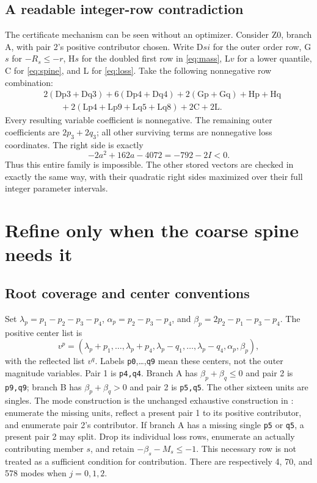 \documentclass[11pt,a4paper]{article}
\begin{document}
\subsection{A readable integer-row contradiction}
The certificate mechanism can be seen without an optimizer. Consider
Z0, branch A, with pair 2's positive contributor chosen. Write D$s i$
for the outer order row, G$s$ for $-R_s\le-r$, H$s$ for the doubled
first row in \eqref{eq:mass}, L$v$ for a lower quantile,
C for \eqref{eq:spine}, and L for \eqref{eq:loss}.
Take the following nonnegative row combination:
\begin{align*}
 &2(\mathrm{Dp3}+\mathrm{Dq3})+6(\mathrm{Dp4}+\mathrm{Dq4})
 +2(\mathrm{Gp}+\mathrm{Gq})+\mathrm{Hp}+\mathrm{Hq}\\
 &\qquad+2(\mathrm{Lp4}+\mathrm{Lp9}+\mathrm{Lq5}+\mathrm{Lq8})
 +2\mathrm C+2\mathrm L.
\end{align*}
Every resulting variable coefficient is nonnegative. The remaining
outer coefficients are $2p_3+2q_3$; all other surviving terms are
nonnegative loss coordinates. The right side is exactly
\[
 -2a^2+162a-4072=-792-2I<0.
\]
Thus this entire family is impossible. The other stored vectors are
checked in exactly the same way, with their quadratic right sides
maximized over their full integer parameter intervals.

\section{Refine only when the coarse spine needs it}
\subsection{Root coverage and center conventions}
Set $\lambda_p=p_1-p_2-p_3-p_4$,
$\alpha_p=p_2-p_3-p_4$, and $\beta_p=2p_2-p_1-p_3-p_4$.
The positive center list is
\[
 v^p=(\lambda_p+p_1,\ldots,\lambda_p+p_4,
 \lambda_p-q_1,\ldots,\lambda_p-q_4,\alpha_p,\beta_p),
\]
with the reflected list $v^q$. Labels \texttt{p0},\ldots,\texttt{q9}
mean these centers, not the outer magnitude variables.
Pair 1 is \texttt{p4,q4}. Branch A has $\beta_p+\beta_q\le0$ and
pair 2 is \texttt{p9,q9}; branch B has $\beta_p+\beta_q>0$ and pair 2
is \texttt{p5,q5}. The other sixteen units are singles.
The mode construction is the unchanged exhaustive construction in
\cite{previous}: enumerate the missing units, reflect a present pair 1
to its positive contributor, and enumerate pair 2's contributor.
If branch A has a missing single \texttt{p5} or \texttt{q5}, a present
pair 2 may split. Drop its individual loss rows, enumerate an actually
contributing member $s$, and retain $-\beta_s-M_s\le-1$.
This necessary row is not treated as a sufficient condition for contribution.
There are respectively 4, 70, and 578 modes when $j=0,1,2$.
\end{document}
